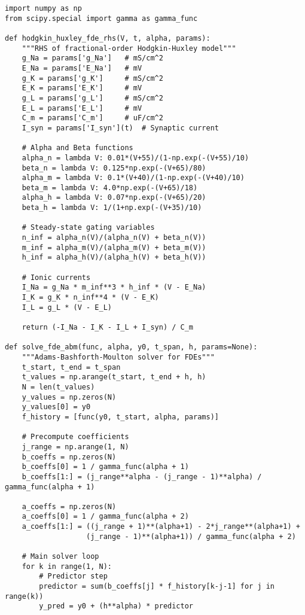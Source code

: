 \documentclass[a4paper,12pt]{article}
\begin{document}
\begin{lstlisting}[style=python, caption={Python implementation of ABM solver for FDEs}, label={lst:python-fde}]
import numpy as np
from scipy.special import gamma as gamma_func

def hodgkin_huxley_fde_rhs(V, t, alpha, params):
    """RHS of fractional-order Hodgkin-Huxley model"""
    g_Na = params['g_Na']   # mS/cm^2
    E_Na = params['E_Na']   # mV
    g_K = params['g_K']     # mS/cm^2
    E_K = params['E_K']     # mV
    g_L = params['g_L']     # mS/cm^2
    E_L = params['E_L']     # mV
    C_m = params['C_m']     # uF/cm^2
    I_syn = params['I_syn'](t)  # Synaptic current
    
    # Alpha and Beta functions
    alpha_n = lambda V: 0.01*(V+55)/(1-np.exp(-(V+55)/10)
    beta_n = lambda V: 0.125*np.exp(-(V+65)/80)
    alpha_m = lambda V: 0.1*(V+40)/(1-np.exp(-(V+40)/10)
    beta_m = lambda V: 4.0*np.exp(-(V+65)/18)
    alpha_h = lambda V: 0.07*np.exp(-(V+65)/20)
    beta_h = lambda V: 1/(1+np.exp(-(V+35)/10)
    
    # Steady-state gating variables
    n_inf = alpha_n(V)/(alpha_n(V) + beta_n(V))
    m_inf = alpha_m(V)/(alpha_m(V) + beta_m(V))
    h_inf = alpha_h(V)/(alpha_h(V) + beta_h(V))
    
    # Ionic currents
    I_Na = g_Na * m_inf**3 * h_inf * (V - E_Na)
    I_K = g_K * n_inf**4 * (V - E_K)
    I_L = g_L * (V - E_L)
    
    return (-I_Na - I_K - I_L + I_syn) / C_m

def solve_fde_abm(func, alpha, y0, t_span, h, params=None):
    """Adams-Bashforth-Moulton solver for FDEs"""
    t_start, t_end = t_span
    t_values = np.arange(t_start, t_end + h, h)
    N = len(t_values)
    y_values = np.zeros(N)
    y_values[0] = y0
    f_history = [func(y0, t_start, alpha, params)]
    
    # Precompute coefficients
    j_range = np.arange(1, N)
    b_coeffs = np.zeros(N)
    b_coeffs[0] = 1 / gamma_func(alpha + 1)
    b_coeffs[1:] = (j_range**alpha - (j_range - 1)**alpha) / gamma_func(alpha + 1)
    
    a_coeffs = np.zeros(N)
    a_coeffs[0] = 1 / gamma_func(alpha + 2)
    a_coeffs[1:] = ((j_range + 1)**(alpha+1) - 2*j_range**(alpha+1) + 
                   (j_range - 1)**(alpha+1)) / gamma_func(alpha + 2)
    
    # Main solver loop
    for k in range(1, N):
        # Predictor step
        predictor = sum(b_coeffs[j] * f_history[k-j-1] for j in range(k))
        y_pred = y0 + (h**alpha) * predictor
        

\end{lstlisting}
\end{document}

